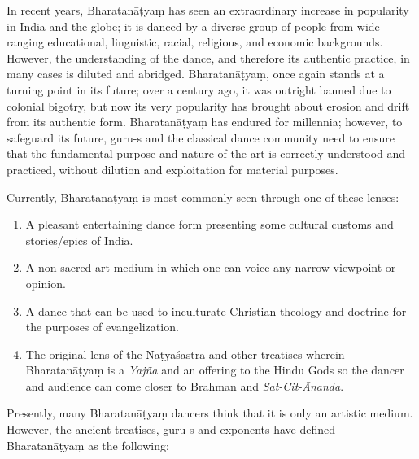 In recent years, Bharatanāṭyaṃ has seen an extraordinary increase in popularity in India and the globe; it is danced by a diverse group of people from wide-ranging educational, linguistic, racial, religious, and economic backgrounds. However, the understanding of the dance, and therefore its authentic practice, in many cases is diluted and abridged. Bharatanāṭyaṃ, once again stands at a turning point in its future; over a century ago, it was outright banned due to colonial bigotry, but now its very popularity has brought about erosion and drift from its authentic form. Bharatanāṭyaṃ has endured for millennia; however, to safeguard its future, guru-s and the classical dance community need to ensure that the fundamental purpose and nature of the art is correctly understood and practiced, without dilution and exploitation for material purposes.

Currently, Bharatanāṭyaṃ is most commonly seen through one of these lenses:

\begin{enumerate}[{\rm 1)}]
\itemsep=0pt
\item A pleasant entertaining dance form presenting some cultural customs and stories/epics of India.

 \item A non-sacred art medium in which one can voice any narrow viewpoint or opinion.

 \item A dance that can be used to inculturate Christian theology and doctrine for the purposes of evangelization. 

 \item The original lens of the Nāṭyaśāstra and other treatises wherein Bharatanāṭyaṃ is a \textit{Yajña} and an offering to the Hindu Gods so the dancer and audience can come closer to Brahman and \textit{Sat-Cit-Ānanda}.

\end{enumerate}

Presently, many Bharatanāṭyaṃ dancers think that it is only an artistic medium. However, the ancient treatises, guru-s and exponents have defined Bharatanāṭyaṃ as the following:

